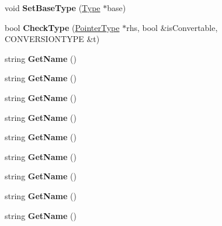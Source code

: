 \begin{DoxyCompactItemize}
\item 
\hypertarget{classPointerType_abfb4082aafcedbe8660cfadabbe79f18}{void {\bfseries Set\-Base\-Type} (\hyperlink{classType}{Type} $\ast$base)}\label{classPointerType_abfb4082aafcedbe8660cfadabbe79f18}

\item 
\hypertarget{classPointerType_a01b7271726a3f891c9556cbbab3a4410}{bool {\bfseries Check\-Type} (\hyperlink{classPointerType}{Pointer\-Type} $\ast$rhs, bool \&is\-Convertable, C\-O\-N\-V\-E\-R\-S\-I\-O\-N\-T\-Y\-P\-E \&t)}\label{classPointerType_a01b7271726a3f891c9556cbbab3a4410}

\item 
\hypertarget{classType_a8143fe4686ae1a5709a5955396c6ee26}{string {\bfseries Get\-Name} ()}\label{classType_a8143fe4686ae1a5709a5955396c6ee26}

\item 
\hypertarget{classType_a8143fe4686ae1a5709a5955396c6ee26}{string {\bfseries Get\-Name} ()}\label{classType_a8143fe4686ae1a5709a5955396c6ee26}

\item 
\hypertarget{classType_a8143fe4686ae1a5709a5955396c6ee26}{string {\bfseries Get\-Name} ()}\label{classType_a8143fe4686ae1a5709a5955396c6ee26}

\item 
\hypertarget{classType_a8143fe4686ae1a5709a5955396c6ee26}{string {\bfseries Get\-Name} ()}\label{classType_a8143fe4686ae1a5709a5955396c6ee26}

\item 
\hypertarget{classType_a8143fe4686ae1a5709a5955396c6ee26}{string {\bfseries Get\-Name} ()}\label{classType_a8143fe4686ae1a5709a5955396c6ee26}

\item 
\hypertarget{classType_a8143fe4686ae1a5709a5955396c6ee26}{string {\bfseries Get\-Name} ()}\label{classType_a8143fe4686ae1a5709a5955396c6ee26}

\item 
\hypertarget{classType_a8143fe4686ae1a5709a5955396c6ee26}{string {\bfseries Get\-Name} ()}\label{classType_a8143fe4686ae1a5709a5955396c6ee26}

\item 
\hypertarget{classType_a8143fe4686ae1a5709a5955396c6ee26}{string {\bfseries Get\-Name} ()}\label{classType_a8143fe4686ae1a5709a5955396c6ee26}

\item 
\hypertarget{classType_a8143fe4686ae1a5709a5955396c6ee26}{string {\bfseries Get\-Name} ()}\label{classType_a8143fe4686ae1a5709a5955396c6ee26}


\end{DoxyCompactItemize}
